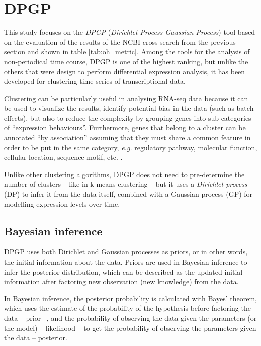 \section{DPGP}
This study focuses on the \emph{DPGP} (\emph{Dirichlet Process Gaussian Process}) tool based on the evaluation of the results of the NCBI cross-search from the previous section and shown in table \ref{tab:oh_metric}. Among the tools for the analysis of non-periodical time course, DPGP is one of the highest ranking, but unlike the others that were design to perform differential expression analysis, it has been developed for clustering time series of transcriptional data.

Clustering can be particularly useful in analysing RNA-seq data because it can be used to visualize the results, identify potential bias in the data (such as batch effects), but also to reduce the complexity by grouping genes into sub-categories of ``expression behaviours''. Furthermore, genes that belong to a cluster can be annotated ``by association'' assuming that they must share a common feature in order to be put in the same category, \textit{e.g.} regulatory pathway, molecular function, cellular location, sequence motif, etc. \citep{walkerPredictionGeneFunction1999}.

Unlike other clustering algorithms, DPGP does not need to pre-determine the number of clusters -- like in k-means clustering -- but it uses a \emph{Dirichlet process} (DP) to infer it from the data itself, combined with a Gaussian process (GP) for modelling expression levels over time.

\subsection{Bayesian inference}
DPGP uses both Dirichlet and Gaussian processes as priors, or in other words, the initial information about the data. Priors are used in Bayesian inference to infer the posterior distribution, which can be described as the updated initial information after factoring new observation (new knowledge) from the data.

In Bayesian inference, the posterior probability is calculated with Bayes' theorem, which uses the estimate of the probability of the hypothesis before factoring the data -- prior --, and the probability of observing the data given the parameters (or the model) -- likelihood -- to get the probability of observing the parameters given the data -- posterior.

